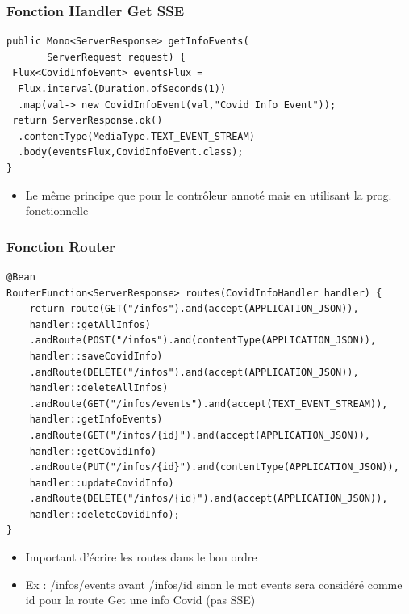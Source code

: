 \documentclass{beamer}
\begin{document}
\begin{frame}[fragile]
	\frametitle{Fonction Handler Get SSE}
\begin{lstlisting}
public Mono<ServerResponse> getInfoEvents(
       ServerRequest request) {
 Flux<CovidInfoEvent> eventsFlux = 
  Flux.interval(Duration.ofSeconds(1))
  .map(val-> new CovidInfoEvent(val,"Covid Info Event"));
 return ServerResponse.ok()
  .contentType(MediaType.TEXT_EVENT_STREAM)
  .body(eventsFlux,CovidInfoEvent.class);
}
\end{lstlisting}	
	\begin{itemize}
		\item Le même principe que pour le contrôleur annoté mais en utilisant la prog. fonctionnelle
	\end{itemize}
\end{frame}

\begin{frame}[fragile]
	\frametitle{Fonction Router}
\begin{lstlisting}[basicstyle=\tiny]
@Bean
RouterFunction<ServerResponse> routes(CovidInfoHandler handler) {	
	return route(GET("/infos").and(accept(APPLICATION_JSON)),
	handler::getAllInfos)
	.andRoute(POST("/infos").and(contentType(APPLICATION_JSON)),
	handler::saveCovidInfo)
	.andRoute(DELETE("/infos").and(accept(APPLICATION_JSON)),
	handler::deleteAllInfos)
	.andRoute(GET("/infos/events").and(accept(TEXT_EVENT_STREAM)),
	handler::getInfoEvents)
	.andRoute(GET("/infos/{id}").and(accept(APPLICATION_JSON)),
	handler::getCovidInfo)
	.andRoute(PUT("/infos/{id}").and(contentType(APPLICATION_JSON)),
	handler::updateCovidInfo)
	.andRoute(DELETE("/infos/{id}").and(accept(APPLICATION_JSON)),
	handler::deleteCovidInfo);
}
\end{lstlisting}	
	\begin{itemize}
		\item Important d'écrire les routes dans le bon ordre
		\item Ex : /infos/events avant /infos/{id} sinon le mot events sera considéré comme id pour la route Get une info Covid (pas SSE)
	\end{itemize}
\end{frame}
\end{document}
